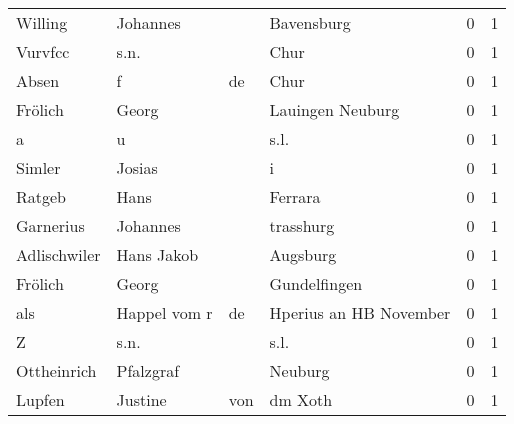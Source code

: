 \begin{center}
\begin{tiny}
\begin{longtabu}{llllrr}
                  Willing &                           Johannes &             &                                  Bavensburg &          0 &         1 \\
                  Vurvfcc &                               s.n. &             &                                        Chur &          0 &         1 \\
                    Absen &                                  f &          de &                                        Chur &          0 &         1 \\
                  Frölich &                              Georg &             &                            Lauingen Neuburg &          0 &         1 \\
                        a &                                  u &             &                                        s.l. &          0 &         1 \\
                   Simler &                             Josias &             &                                           i &          0 &         1 \\
                   Ratgeb &                               Hans &             &                                     Ferrara &          0 &         1 \\
                Garnerius &                           Johannes &             &                                   trasshurg &          0 &         1 \\
             Adlischwiler &                         Hans Jakob &             &                                    Augsburg &          0 &         1 \\
                  Frölich &                              Georg &             &                                Gundelfingen &          0 &         1 \\
                      als &                       Happel vom r &          de &                      Hperius an HB November &          0 &         1 \\
                        Z &                               s.n. &             &                                        s.l. &          0 &         1 \\
              Ottheinrich &                          Pfalzgraf &             &                                     Neuburg &          0 &         1 \\
                   Lupfen &                            Justine &         von &                                     dm Xoth &          0 &         1 \\

\end{longtabu}
\end{tiny}
\end{center}
